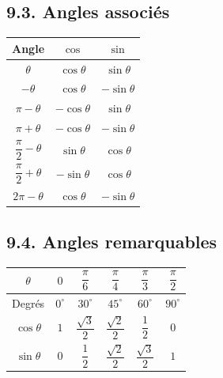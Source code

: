 \documentclass[11pt,a4paper]{article}
\begin{document}
\subsection*{9.3. Angles associés}

\begin{center}
\begin{tabular}{|c|c|c|}
\hline
\textbf{Angle} & $\cos$ & $\sin$ \\
\hline
$\theta$ & $\cos\theta$ & $\sin\theta$ \\
\hline
$-\theta$ & $\cos\theta$ & $-\sin\theta$ \\
\hline
$\pi-\theta$ & $-\cos\theta$ & $\sin\theta$ \\
\hline
$\pi+\theta$ & $-\cos\theta$ & $-\sin\theta$ \\
\hline
$\dfrac{\pi}{2}-\theta$ & $\sin\theta$ & $\cos\theta$ \\
\hline
$\dfrac{\pi}{2}+\theta$ & $-\sin\theta$ & $\cos\theta$ \\
\hline
$2\pi-\theta$ & $\cos\theta$ & $-\sin\theta$ \\
\hline
\end{tabular}
\end{center}

\subsection*{9.4. Angles remarquables}

\begin{center}
\begin{tabular}{|c|c|c|c|c|c|}
\hline
$\theta$ & $0$ & $\dfrac{\pi}{6}$ & $\dfrac{\pi}{4}$ & $\dfrac{\pi}{3}$ & $\dfrac{\pi}{2}$ \\
\hline
Degrés & $0^\circ$ & $30^\circ$ & $45^\circ$ & $60^\circ$ & $90^\circ$ \\
\hline
$\cos\theta$ & $1$ & $\dfrac{\sqrt{3}}{2}$ & $\dfrac{\sqrt{2}}{2}$ & $\dfrac{1}{2}$ & $0$ \\
\hline
$\sin\theta$ & $0$ & $\dfrac{1}{2}$ & $\dfrac{\sqrt{2}}{2}$ & $\dfrac{\sqrt{3}}{2}$ & $1$ \\
\hline
\end{tabular}
\end{center}
\end{document}
